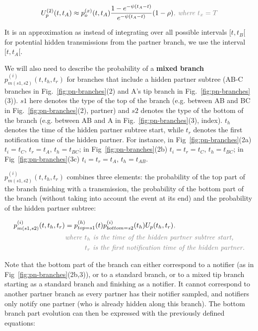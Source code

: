 \documentclass[a4paper,10pt]{article}
\begin{document}
\begin{equation}
U_p^{(2)}(t, t_A) \approx p_o^{(x)}(t, t_A) \frac{1 - e^{-\psi(t_A - t)}}{e^{-\psi(t_A - t)}} (1 - \rho)\textit{\color{gray}, where $t_x =T$}
\end{equation}

It is an approximation as instead of integrating over all possible intervals $[t, t_B[$ for potential hidden transmissions from the partner branch, we use the interval $[t, t_A[$.
 

We will also need to describe the probability of a\textbf{ mixed branch} $p_{m(s1,s2)}^{(i)}(t,t_h,t_r)$ for branches that include a hidden partner subtree (AB-C branches in Fig.~\ref{fig:pn-branches}(2) and A's tip branch in Fig.~\ref{fig:pn-branches}(3)). $s1$ here denotes the type of the top of the branch (e.g. between AB and BC in Fig.~\ref{fig:pn-branches}(2), partner) and $s2$ denotes the type of the bottom of the branch (e.g. between AB and A in Fig.~\ref{fig:pn-branches}(3), index). $t_h$ denotes the time of the hidden partner subtree start, while $t_r$ denotes the first notification time of the hidden partner. For instance, in Fig~\ref{fig:pn-branches}(2a) $t_i=t_C$, $t_r=t_A$, $t_h=t_{BC}$; in Fig~\ref{fig:pn-branches}(2b) $t_i=t_r=t_C$, $t_h=t_{BC}$; in Fig~\ref{fig:pn-branches}(3c) $t_i=t_r=t_A$, $t_h=t_{AB}$. 

$p_{m(s1,s2)}^{(i)}(t,t_h,t_r)$ combines three elements: the probability of the top part of the branch finishing with a transmission, the probability of the bottom part of the branch (without taking into account the event at its end) and the probability of the hidden partner subtree:

\begin{equation}
\begin{split}
p_{m(s1,s2)}^{(i)}(t,t_h,t_r) &= p_{top=s1}^{(h)}(t)p_{bottom=s2}^{(i)}(t_h)U_p(t_h,t_r)\textit{\color{gray},}\\
&\textit{\color{gray}where $t_h$ is the time of the hidden partner subtree start,}\\
&\textit{\color{gray}~~~~~~~~$t_r$ is the first notification time of the hidden partner.}\\
\end{split}
\end{equation}\label{eq:mixed}


Note that the bottom part of the branch can either correspond to a notifier (as in Fig~\ref{fig:pn-branches}(2b,3)), or to a standard branch, or to a mixed tip branch starting as a standard branch and finishing as a notifier. It cannot correspond to another partner branch as every partner has their notifier sampled, and notifiers only notify one partner (who is already hidden along this branch). The bottom branch part evolution can then be expressed with the previously defined equations:
\end{document}
